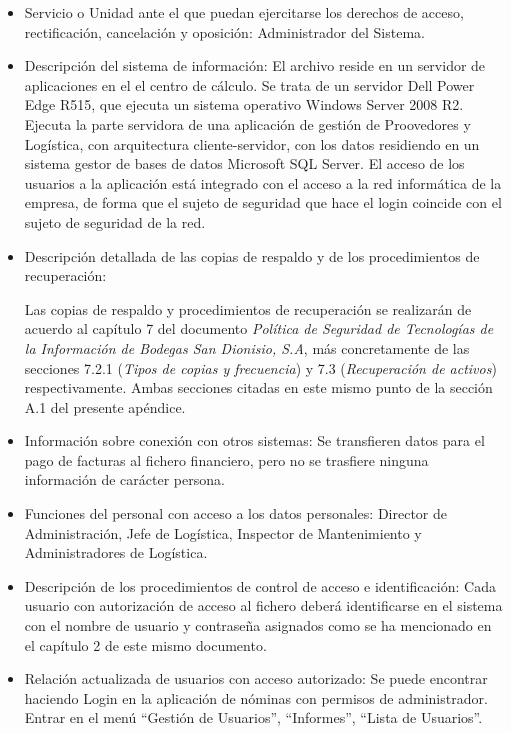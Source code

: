\documentclass[a4paper,11pt,bibtotoc,noliststotoc]{scrbook}
\begin{document}
\begin{itemize}
\item Servicio o Unidad ante el que puedan ejercitarse los derechos de acceso, rectificación, cancelación y oposición: Administrador del Sistema.

\item Descripción del sistema de información: El archivo reside en un servidor de aplicaciones en el el centro de cálculo. Se trata de un servidor Dell Power Edge R515, que ejecuta un sistema operativo Windows Server 2008 R2. Ejecuta la parte servidora de una aplicación de gestión de Proovedores y Logística, con arquitectura cliente-servidor, con los datos residiendo en un sistema gestor de bases de datos Microsoft SQL Server. El acceso de los usuarios a la aplicación está integrado con el acceso a la red informática de la empresa, de forma que el sujeto de seguridad que hace el login coincide con el sujeto de seguridad de la red.

\item Descripción detallada de las copias de respaldo y de los procedimientos de recuperación:

Las copias de respaldo y procedimientos de recuperación se realizarán de acuerdo al capítulo 7 del documento \emph{Política de Seguridad de Tecnologías de la Información de Bodegas San Dionisio, S.A}, más concretamente de las secciones 7.2.1 (\emph{Tipos de copias y frecuencia}) y 7.3 (\emph{Recuperación de activos}) respectivamente. Ambas secciones citadas en este mismo punto de la sección A.1 del presente apéndice.

\item Información sobre conexión con otros sistemas: Se transfieren datos para el pago de facturas al fichero financiero, pero no se trasfiere ninguna información de carácter persona.

\item Funciones del personal con acceso a los datos personales: Director de Administración, Jefe de Logística, Inspector de Mantenimiento y Administradores de Logística.

\item Descripción de los procedimientos de control de acceso e identificación: Cada usuario con autorización de acceso al fichero deberá identificarse en el sistema con el nombre de usuario y contraseña asignados como se ha mencionado en el capítulo 2 de este mismo documento.

\item Relación actualizada de usuarios con acceso autorizado: Se puede encontrar haciendo Login en la aplicación de nóminas con permisos de administrador. Entrar en el menú "`Gestión de Usuarios"', "`Informes"', "`Lista de Usuarios"'.


\end{itemize}
\end{document}
